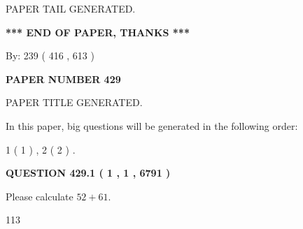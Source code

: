 \documentclass[12pt]{article}
\begin{document}
   
   
\vspace{2.0in} PAPER TAIL GENERATED.
   
   
   
   
\vspace{1.0in} 
{\textbf{\large{ *** END OF PAPER, THANKS *** }}} 
   
   
\hspace{1.0in} By: 
 239 ( 416 ,  613 )
   
   
   
   
\newpage 
\setcounter{page}{ 
   429001 } 
   
   
   
   
 {\textbf{ \Large{ PAPER NUMBER  429  }}}
   
   
\vspace{0.2in}
   
   
   
   
   
   
   
   
 \vspace{0.2in}
 
 
 
 
   
   
 PAPER TITLE GENERATED.
   
   
   
\vspace{0.2in}
   
In this paper, big questions will be generated in the following order: 
   
   
   1 ( 1 )
 ,
   2 ( 2 )
 .
  
\vspace{0.2in}
  
{\textbf{\Large{QUESTION
429.1 
 ( 1 , 1 , 6791 )
}}}
  
  
 
Please calculate $ %
52 +  %
61 $.
 
 
 
\noindent{}
 
 

113
 
 
\noindent{}
 
 

 
 
 
\noindent{}
 
\end{document}
